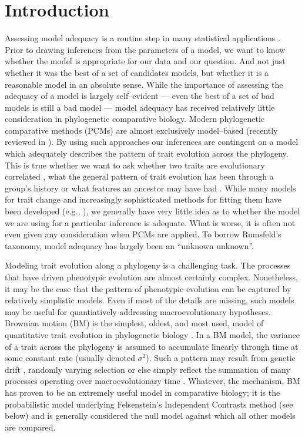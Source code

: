 \documentclass[a4paper,12pt]{article}
\begin{document}
\section{Introduction}

Assessing model adequacy is a routine step in many statistical applications \citep{Gelmanbook}. Prior to drawing inferences from the parameters of a model, we want to know whether the model is appropriate for our data and our question. And not just whether it was the best of a set of candidates models, but whether it is a reasonable model in an absolute sense. While the importance of assessing the adequacy of a model is largely self--evident --- even the best of a set of bad models is still a bad model --- model adequacy has received relatively little consideration in phylogenetic comparative biology. Modern phylogenetic comparative methods (PCMs) are almost exclusively model--based (recently reviewed in \citep{Omeara2012, PennellHarmon}). By using such approaches our inferences are contingent on a model which adequately describes the pattern of trait evolution across the phylogeny. This is true whether we want to ask whether two traits are evolutionary correlated \citep{Felsenstein1985, Grafen1989, HarveyPagel1991}, what the general pattern of trait evolution has been through a group's history \citep{Mooers1999, Harmon2010, Hunt2012} or what features an ancestor may have had \citep{Schluter1997}. While many models for trait change and increasingly sophisticated methods for fitting them have been developed (e.g., \citep{Felsenstein1985, Hansen1997, Pagel1999, ButlerKing2004, Omeara2006, Eastman2011, Beaulieu2012}), we generally have very little idea as to whether the model we are using for a particular inference is adequate. What is worse, it is often not even given any consideration when PCMs are applied. To borrow Rumsfeld's taxonomy, model adequacy has largely been an ``unknown unknown''.

Modeling trait evolution along a phylogeny is a challenging task. The processes that have driven phenotypic evolution are almost certainly complex. Nonetheless, it may be the case that the pattern of phenotypic evolution can be captured by relatively simplistic models. Even if most of the details are missing, such models may be useful for quantiatively addressing macroevolutionary hypotheses. Brownian motion (BM) is the simplest, oldest, and most used, model of quantitative trait evolution in phylogenetic biology  \citep{Edwards1964, Felsenstein1973, Thompson1975, Felsenstein1985}. In a BM model, the variance of a trait across the phylogeny is assumed to accumulate linearly through time at some constant rate (usually denoted $\sigma^2$). Such a pattern may result from genetic drift \citep{Lande1977, Felsenstein1988, Lynch1990, HansenMartins1996}, randomly varying selection \citep{Felsenstein1973, Felsenstein1988} or else simply reflect the summation of many processes operating over macroevolutionary time \citep{HansenMartins1996, Uyeda2011, PennellPE}. Whatever, the mechanism, BM has proven to be an extremely useful model in comparative biology; it is the probabilistic model underlying Felsenstein's Independent Contrasts method \citep{Felsenstein1985} (see below) and is generally considered the null model against which all other models are compared.
 
\end{document}
